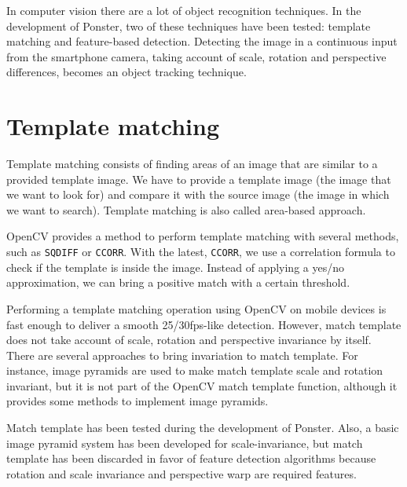 In computer vision there are a lot of object recognition techniques. In the
development of Ponster, two of these techniques have been tested: template
matching and feature-based detection. Detecting the image in a continuous input from
the smartphone camera, taking account of scale, rotation and perspective
differences, becomes an object tracking technique. 

\section{Template matching}
Template matching consists of finding areas of an image that are similar to a
provided template image. We have to provide a template image (the image that we want
to look for) and compare it with the source image (the image in which we want to
search). Template matching is also called area-based approach.

OpenCV provides a method to perform template matching with several methods, such as
\texttt{SQDIFF} or \texttt{CCORR}. With the latest, \texttt{CCORR}, we use a
correlation formula to check if the template is inside the image. Instead of
applying a yes/no approximation, we can bring a positive match with a certain
threshold. 


Performing a template matching operation using OpenCV on mobile devices is fast
enough to deliver a smooth 25/30fps-like detection. However, match template does not
take account of scale, rotation and perspective invariance by itself. There are
several approaches to bring invariation to match template. For instance, image
pyramids are used to make match template scale and rotation
invariant, but it is not part of the OpenCV match template function, although it
provides some methods to implement image pyramids. 

Match template has been tested during the development of Ponster. Also, a basic
image pyramid system has been developed for scale-invariance, but match template has
been discarded in favor of feature detection algorithms because rotation and scale
invariance and perspective warp are required features.


